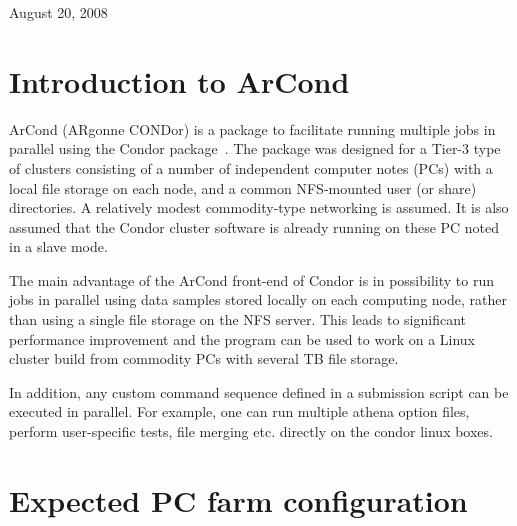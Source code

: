 \documentclass[a4paper]{book}
\begin{document}
\begin{titlepage}
\clearemptydoublepage
\vspace*{7cm}
\begin{center}


\vspace*{2cm}

\vspace*{0.5cm}

August 20, 2008
\end{center}
\end{titlepage}
\clearemptydoublepage
{}


\section{Introduction to ArCond}
\label{intro}
ArCond (ARgonne CONDor) is a package to facilitate running multiple jobs in 
parallel using the Condor package~\cite{condor}.
The package was designed for a Tier-3 type of clusters  consisting  of  a number of
independent computer notes (PCs) with a local file storage on each node, 
and a common NFS-mounted user (or share) 
directories. A relatively modest commodity-type networking is assumed.
It is also assumed that the Condor cluster software is already running on these PC
noted in a slave mode.

The main advantage of the ArCond front-end of Condor is in  possibility to run jobs
in parallel using data samples stored locally on each computing node, 
rather than using a single file storage on the NFS server.
This leads to significant performance improvement and the program
can be used to work on a Linux cluster build from commodity PCs with several
TB file storage.  

In addition, any custom  command sequence defined in a submission script 
can be executed in parallel. For example, one can run multiple athena option files,
perform user-specific tests, file merging etc. directly on the condor linux
boxes. 



\section{Expected PC farm configuration}
 
\end{document}

